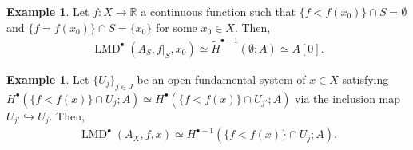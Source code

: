 \documentclass[a4paper,dvipdfmx,reqno,12pt]{amsart}
\theoremstyle{definition}
\newtheorem{example}[theorem]{Example}
\newcommand{\opn}[1]{\operatorname{#1}}
\newcommand{\hookto}{\hookrightarrow}
\numberwithin{equation}{section}
\begin{document}
\begin{example}
Let $f\colon X \to \mathbb{R}$ a continuous function 
such that $\{f<f(x_0)\}\cap S=\emptyset$ and 
$\{f=f(x_0)\}\cap S=\{x_0\}$ for some $x_0\in X$. 
Then,
\begin{align}
\opn{LMD}^{\bullet}(A_S,f|_{S},x_0)\simeq 
\tilde{H}^{\bullet-1}(\emptyset;A)\simeq A[0].
\end{align}

\end{example}

\begin{example} \label{example-fundamental-system}
Let $\{U_j\}_{j\in J}$ be an open fundamental system of 
$x\in X$ satisfying
$H^{\bullet}(\{f<f(x)\}\cap U_j;A)\simeq 
H^{\bullet}(\{f<f(x)\}\cap U_{j'};A)$ via the 
inclusion map $U_{j'}\hookto U_j$. Then, 
\begin{align}
\opn{LMD}^{\bullet}(A_X,f,x)\simeq H^{\bullet-1}(\{f<f(x)\}\cap U_j;A).
\end{align}

\end{example}
\end{document}
